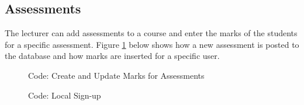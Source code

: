 \documentclass[a4paper,12pt]{article}
\numberwithin{equation}{section} %
\numberwithin{figure}{section}
\begin{document}
\subsection{Assessments}
The lecturer can add assessments to a course and enter the marks of the students for a specific assessment. Figure \ref{cAses} below shows how a new assessment is posted to the database and how marks are inserted for a specific user.

\begin{figure}[H]
\centering
{}
\caption{Code: Create and Update Marks for Assessments}
\label{cAses}
\end{figure}


\begin{figure}[H]
\centering
{}
\caption{Code: Local Sign-up}
\label{cLocalSignup}
\end{figure}
\end{document}

